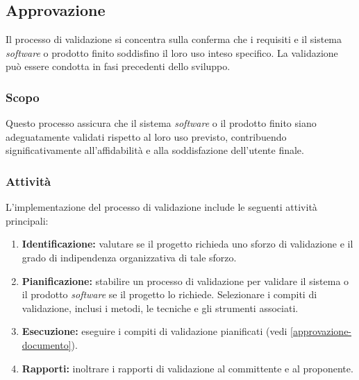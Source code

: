 \subsection{Approvazione}

Il processo di validazione si concentra sulla conferma che i requisiti e il
sistema \textit{software} o prodotto finito soddisfino il loro uso inteso
specifico. La validazione può essere condotta in fasi precedenti dello sviluppo.

\subsubsection{Scopo}

Questo processo assicura che il sistema \textit{software} o il prodotto finito
siano adeguatamente validati rispetto al loro uso previsto, contribuendo
significativamente all'affidabilità e alla soddisfazione dell'utente finale.

\subsubsection{Attività}
L'implementazione del processo di validazione include le seguenti attività
principali:

\begin{enumerate}
	\item \textbf{Identificazione:} valutare se il progetto richieda uno sforzo
	      di validazione e il grado di indipendenza organizzativa di tale
	      sforzo.
	\item \textbf{Pianificazione:} stabilire un processo di validazione per
	      validare il sistema o il prodotto \textit{software} se il progetto lo
	      richiede. Selezionare i compiti di validazione, inclusi i metodi, le
	      tecniche e gli strumenti associati.
	\item \textbf{Esecuzione:} eseguire i compiti di validazione pianificati
	      (vedi \autoref{approvazione-documento}).
	\item \textbf{Rapporti:} inoltrare i rapporti di validazione al committente
	      e al proponente.
\end{enumerate}
